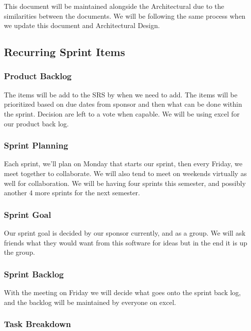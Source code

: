 This document will be maintained alongside the Architectural due to the similarities between the documents. We will be following the same process when we update this document and Architectural Design. 

\subsection{Recurring Sprint Items}



\subsubsection{Product Backlog}

The items will be add to the SRS by when we need to add. The items will be prioritized based on due dates from sponsor and then what can be done within the sprint. Decision are left to a vote when capable. We will be using excel for our product back log. 


\subsubsection{Sprint Planning}

Each sprint, we'll plan on Monday that starts our sprint, then every Friday, we meet together to collaborate. We will also tend to meet on weekends virtually as well for collaboration. We will be having four sprints this semester, and possibly another 4 more sprints for the next semester.

\subsubsection{Sprint Goal}

Our sprint goal is decided by our sponsor currently, and as a group. We will ask friends what they would want from this software for ideas but in the end it is up the group.

\subsubsection{Sprint Backlog}

With the meeting on Friday we will decide what goes onto the sprint back log, and the backlog will be maintained by everyone on excel.

\subsubsection{Task Breakdown}

